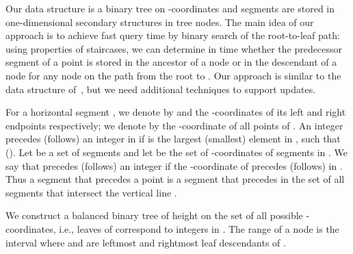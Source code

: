\documentclass[10pt]{llncs}
\begin{document}
Our data structure is a binary tree on -coordinates and segments are stored 
in one-dimensional  secondary structures in  tree nodes. 
The main idea of our approach is to 
 achieve fast query time by binary search of the root-to-leaf 
path: using properties of staircases, we can determine in 
 time whether the predecessor segment of a 
point  is stored in the ancestor of a node  or in the descendant 
of a node  for any node  on the path from the root to . 
Our approach is similar to the data structure of~\cite{BKS95}, but we need 
additional techniques to support updates.

For a horizontal segment , we denote by  and  
the -coordinates of its left and right endpoints respectively;
we denote by  the -coordinate of all points of .
An integer  precedes (follows) an integer  in  if  is 
the largest (smallest) element in , such that  ().
Let  be a set of segments and let  be the set of -coordinates 
of segments in . We say that  precedes (follows) an integer 
 if the -coordinate of  precedes (follows)  in .
Thus a segment that precedes a point  is a segment that precedes 
 in the set of all segments that intersect the vertical line . 

We construct a balanced binary tree  of height  on the set of 
all possible -coordinates, i.e.,  leaves of  correspond to  
integers in . The  range of a node  is the interval 
 where  and  are 
leftmost and rightmost leaf descendants of .  
\end{document}
